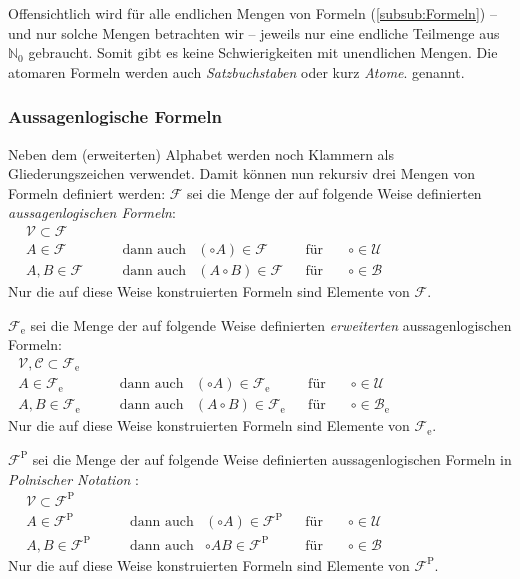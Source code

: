 \documentclass[english,ngerman,parskip=half,headsepline,footsepline,
	fleqn,notitlepage]{scrreprt}
\newcommand*{\gsN}{\mathbb{N}_0}%
\newcommand*{\ase}{_\mathrm{e}}%
\newcommand*{\asp}{^\mathrm{P}}%
\newcommand*{\asB}{\mathcal{B}}%
\newcommand*{\asC}{\mathcal{C}}%
\newcommand*{\asF}{\mathcal{F}}%
\newcommand*{\asU}{\mathcal{U}}%
\newcommand*{\asV}{\mathcal{V}}%
\newcommand*{\asBe}{\asB\ase}%
\newcommand*{\asFe}{\asF\ase}%
\newcommand*{\asFp}{\asF\asp}%
\newcommand*{\formulatoleft}{&&&&&&&&&&}%
\newcommand*{\Idx}[1]{#1\idx{#1}}%
\begin{document}
	Offensichtlich wird für alle endlichen Mengen von Formeln
	(\seename \vref{subsub:Formeln})
	-- und nur solche Mengen betrachten wir --
	jeweils nur eine endliche Teilmenge aus $\gsN$ gebraucht.
	Somit gibt es keine Schwierigkeiten mit unendlichen Mengen.
	Die atomaren Formeln werden auch \emph{\Idx{Satzbuchstabe}}\emph{n}
	oder kurz \emph{\Idx{Atom}}\emph{e}. genannt.

	\subsubsection{Aussagenlogische Formeln}%
	\label{subsub:Formeln}

	Neben dem (erweiterten) Alphabet
	werden noch Klammern als Gliederungszeichen verwendet.
	Damit können nun rekursiv drei Mengen von Formeln definiert werden:
	$\asF$ sei die Menge der auf folgende Weise definierten
	\emph{aussagenlogischen Formeln}:
	\begin{align}
		\asV    \subset \asF \\
		A           \in \asF &   \quad \quad \textrm{dann auch} &
		(\circ A)   \in \asF & & \textrm{für} \quad & \circ \in \asU \\
		A, B        \in \asF &   \quad \quad \textrm{dann auch} &
		(A \circ B) \in \asF & & \textrm{für} \quad & \circ \in \asB
		\formulatoleft
	\end{align}
	Nur die auf diese Weise konstruierten Formeln sind Elemente von $\asF$.

	$\asFe$ sei die Menge der auf folgende Weise definierten \emph{erweiterten}
	aussagenlogischen Formeln:
	\begin{align}
		\asV, \asC \subset \asFe \\
		A              \in \asFe & \quad \quad \textrm{dann auch} &
		(\circ A)      \in \asFe & & \textrm{für} \quad & \circ \in \asU  \\
		A, B           \in \asFe & \quad \quad \textrm{dann auch} &
		(A \circ B)    \in \asFe & & \textrm{für} \quad & \circ \in \asBe
		\formulatoleft
	\end{align}
	Nur die auf diese Weise konstruierten Formeln sind Elemente von $\asFe$.

	$\asFp$ sei die Menge der auf folgende Weise definierten
	aussagenlogischen Formeln in \emph{Polnischer Notation}%
	:
	\begin{align}
		\asV    \subset \asFp \\
		A           \in \asFp &   \quad \quad \textrm{dann auch} &
		(\circ A)   \in \asFp & & \textrm{für} \quad & \circ \in \asU \\
		A, B        \in \asFp &   \quad \quad \textrm{dann auch} &
		\circ A B   \in \asFp & & \textrm{für} \quad & \circ \in \asB
		\formulatoleft
	\end{align}
	Nur die auf diese Weise konstruierten Formeln sind Elemente von $\asFp$.
\end{document}
